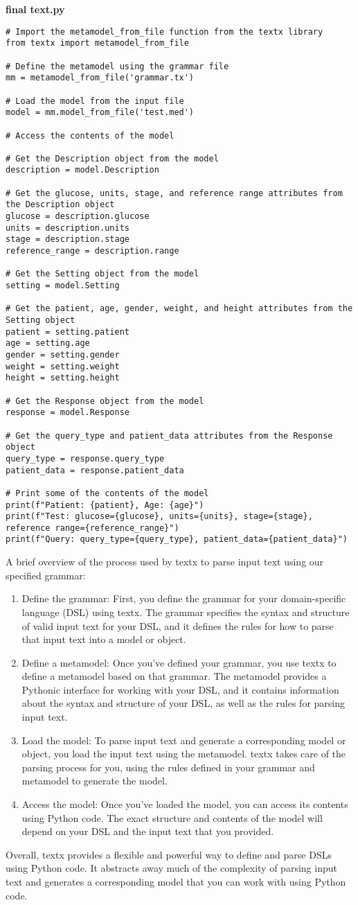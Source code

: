 \textbf{final text.py}
\begin{lstlisting}
# Import the metamodel_from_file function from the textx library
from textx import metamodel_from_file

# Define the metamodel using the grammar file
mm = metamodel_from_file('grammar.tx')

# Load the model from the input file
model = mm.model_from_file('test.med')

# Access the contents of the model

# Get the Description object from the model
description = model.Description

# Get the glucose, units, stage, and reference range attributes from the Description object
glucose = description.glucose
units = description.units
stage = description.stage
reference_range = description.range

# Get the Setting object from the model
setting = model.Setting

# Get the patient, age, gender, weight, and height attributes from the Setting object
patient = setting.patient
age = setting.age
gender = setting.gender
weight = setting.weight
height = setting.height

# Get the Response object from the model
response = model.Response

# Get the query_type and patient_data attributes from the Response object
query_type = response.query_type
patient_data = response.patient_data

# Print some of the contents of the model
print(f"Patient: {patient}, Age: {age}")
print(f"Test: glucose={glucose}, units={units}, stage={stage}, reference range={reference_range}")
print(f"Query: query_type={query_type}, patient_data={patient_data}")
\end{lstlisting}

A brief overview of the process used by textx to parse input text using our specified grammar:
\begin{enumerate}
    \item Define the grammar: First, you define the grammar for your domain-specific language (DSL) using textx. The grammar specifies the syntax and structure of valid input text for your DSL, and it defines the rules for how to parse that input text into a model or object.
    \item Define a metamodel: Once you've defined your grammar, you use textx to define a metamodel based on that grammar. The metamodel provides a Pythonic interface for working with your DSL, and it contains information about the syntax and structure of your DSL, as well as the rules for parsing input text.
    \item Load the model: To parse input text and generate a corresponding model or object, you load the input text using the metamodel. textx takes care of the parsing process for you, using the rules defined in your grammar and metamodel to generate the model.
    \item Access the model: Once you've loaded the model, you can access its contents using Python code. The exact structure and contents of the model will depend on your DSL and the input text that you provided.
\end{enumerate}

Overall, textx provides a flexible and powerful way to define and parse DSLs using Python code. It abstracts away much of the complexity of parsing input text and generates a corresponding model that you can work with using Python code.